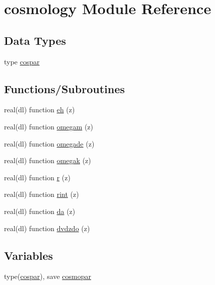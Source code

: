 \hypertarget{namespacecosmology}{}\section{cosmology Module Reference}
\label{namespacecosmology}
\subsection*{Data Types}
\begin{DoxyCompactItemize}
\item 
type \mbox{\hyperlink{structcosmology_1_1cospar}{cospar}}
\end{DoxyCompactItemize}
\subsection*{Functions/\+Subroutines}
\begin{DoxyCompactItemize}
\item 
real(dl) function \mbox{\hyperlink{namespacecosmology_af6e96fd519aaf76a5407429172288537}{eh}} (z)
\item 
real(dl) function \mbox{\hyperlink{namespacecosmology_aeef992799f00205f3a31ac86d34da7e2}{omegam}} (z)
\item 
real(dl) function \mbox{\hyperlink{namespacecosmology_a81af36db5e915a16bc6684c70562c2cc}{omegade}} (z)
\item 
real(dl) function \mbox{\hyperlink{namespacecosmology_ac8a5367c45bf7773b9a8e27fb7ff59ec}{omegak}} (z)
\item 
real(dl) function \mbox{\hyperlink{namespacecosmology_a5acb8c4886ff7017542c3c1ec551f357}{r}} (z)
\item 
real(dl) function \mbox{\hyperlink{namespacecosmology_a9203d5591635fce503b42a2121a1dfaa}{rint}} (z)
\item 
real(dl) function \mbox{\hyperlink{namespacecosmology_a17233f8902b8f4b3f66ff1bfb3406c05}{da}} (z)
\item 
real(dl) function \mbox{\hyperlink{namespacecosmology_a38a12dc082adc18d1fc8a043bd39405c}{dvdzdo}} (z)
\end{DoxyCompactItemize}
\subsection*{Variables}
\begin{DoxyCompactItemize}
\item 
type(\mbox{\hyperlink{structcosmology_1_1cospar}{cospar}}), save \mbox{\hyperlink{namespacecosmology_a58e3904346959bd5f3207f5f1f327e0e}{cosmopar}}
\end{DoxyCompactItemize}


